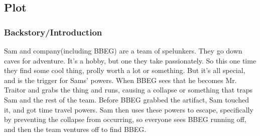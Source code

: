 \documentclass[a4paper,12pt]{article}
\begin{document}
  \subsection{Plot}
  \subsubsection*{Backstory/Introduction}
  Sam and company(including BBEG) are a team of spelunkers. They go down caves for adventure. It's a hobby, but one they take passionately. So this one time they find some cool thing, prolly worth a lot or something. But it's all special, and is the trigger for Sams' powers. When BBEG sees that he becomes Mr. Traitor and grabs the thing and runs, causing a collapse or something that traps Sam and the rest of the team. Before BBEG grabbed the artifact, Sam touched it, and got time travel powers. Sam then uses these powers to escape, specifically by preventing the collapse from occurring, so everyone sees BBEG running off, and then the team ventures off to find BBEG.
\end{document}
